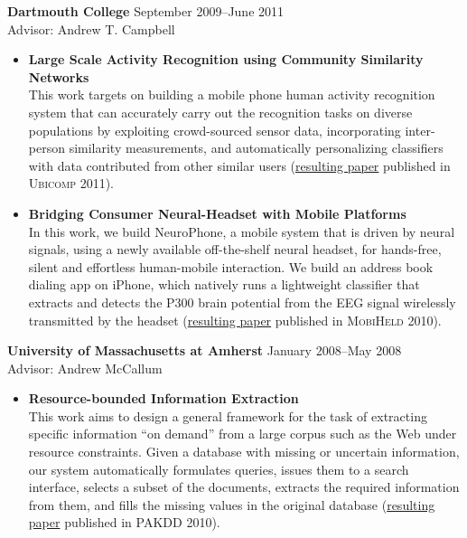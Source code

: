 {\bf Dartmouth College} \hfill September 2009--June 2011\\
Advisor: Andrew T. Campbell 
\begin{itemize}
	\item \textbf{Large Scale Activity Recognition using Community Similarity Networks} \\
	This work targets on building a mobile phone human activity recognition system that can accurately carry out the recognition tasks on diverse populations by exploiting crowd-sourced sensor data, incorporating inter-person similarity measurements, and automatically personalizing classifiers with data contributed from other similar users (\hyperlink{lane2011ubicomp}{resulting paper} published in \textsc{Ubicomp 2011}).
	
	\item \textbf{Bridging Consumer Neural-Headset with Mobile Platforms} \\
	In this work, we build NeuroPhone, a mobile system that is driven by neural signals, using a newly available off-the-shelf neural headset, for hands-free, silent and effortless human-mobile interaction. We build an address book dialing app on iPhone, which natively runs a lightweight classifier that extracts and detects the P300 brain potential from the EEG signal wirelessly transmitted by the headset (\hyperlink{campbell2010mobiheld}{resulting paper} published in \textsc{MobiHeld 2010}). 
\end{itemize}

{\bf University of Massachusetts at Amherst} \hfill January 2008--May 2008 \\
Advisor: Andrew McCallum 
\begin{itemize}
	\item \textbf{Resource-bounded Information Extraction} \\
	This work aims to design a general framework for the task of extracting specific information ``on demand'' from a large corpus such as the Web under resource constraints. Given a database with missing or uncertain information, our system automatically formulates queries, issues them to a search interface, selects a subset of the documents, extracts the required information from them, and fills the missing values in the original database (\hyperlink{kanani2010pakdd}{resulting paper} published in \textsc{PAKDD 2010}). 
\end{itemize}
